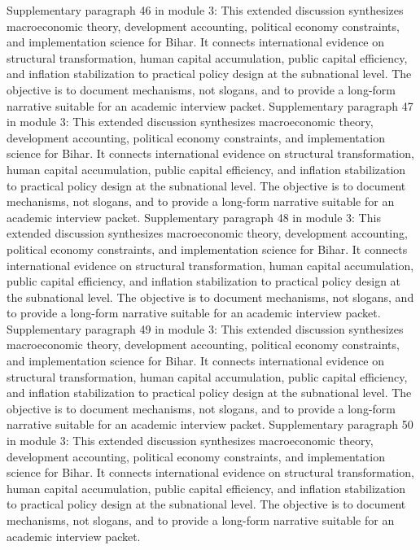 \documentclass[preprint,12pt]{elsarticle}
\begin{document}
Supplementary paragraph 46 in module 3: This extended discussion synthesizes macroeconomic theory, development accounting, political economy constraints, and implementation science for Bihar. It connects international evidence on structural transformation, human capital accumulation, public capital efficiency, and inflation stabilization to practical policy design at the subnational level. The objective is to document mechanisms, not slogans, and to provide a long-form narrative suitable for an academic interview packet.
Supplementary paragraph 47 in module 3: This extended discussion synthesizes macroeconomic theory, development accounting, political economy constraints, and implementation science for Bihar. It connects international evidence on structural transformation, human capital accumulation, public capital efficiency, and inflation stabilization to practical policy design at the subnational level. The objective is to document mechanisms, not slogans, and to provide a long-form narrative suitable for an academic interview packet.
Supplementary paragraph 48 in module 3: This extended discussion synthesizes macroeconomic theory, development accounting, political economy constraints, and implementation science for Bihar. It connects international evidence on structural transformation, human capital accumulation, public capital efficiency, and inflation stabilization to practical policy design at the subnational level. The objective is to document mechanisms, not slogans, and to provide a long-form narrative suitable for an academic interview packet.
Supplementary paragraph 49 in module 3: This extended discussion synthesizes macroeconomic theory, development accounting, political economy constraints, and implementation science for Bihar. It connects international evidence on structural transformation, human capital accumulation, public capital efficiency, and inflation stabilization to practical policy design at the subnational level. The objective is to document mechanisms, not slogans, and to provide a long-form narrative suitable for an academic interview packet.
Supplementary paragraph 50 in module 3: This extended discussion synthesizes macroeconomic theory, development accounting, political economy constraints, and implementation science for Bihar. It connects international evidence on structural transformation, human capital accumulation, public capital efficiency, and inflation stabilization to practical policy design at the subnational level. The objective is to document mechanisms, not slogans, and to provide a long-form narrative suitable for an academic interview packet.
\end{document}
